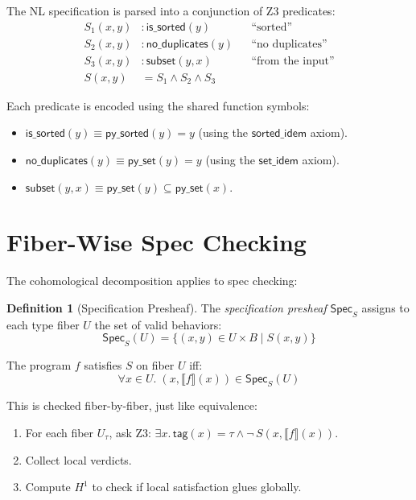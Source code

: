 \documentclass[11pt,a4paper]{report}
\theoremstyle{definition}
\newtheorem{definition}{Definition}[chapter]
\theoremstyle{plain}
\newcommand{\den}[1]{\llbracket #1 \rrbracket}
\newcommand{\Hone}{H^1}
\begin{document}
The NL specification is parsed into a conjunction of Z3 predicates:
\begin{align}
  S_1(x, y) &: \mathsf{is\_sorted}(y)
    && \text{``sorted''} \\
  S_2(x, y) &: \mathsf{no\_duplicates}(y)
    && \text{``no duplicates''} \\
  S_3(x, y) &: \mathsf{subset}(y, x)
    && \text{``from the input''} \\
  S(x, y) &= S_1 \land S_2 \land S_3
\end{align}

Each predicate is encoded using the shared function symbols:
\begin{itemize}
  \item $\mathsf{is\_sorted}(y) \equiv \mathsf{py\_sorted}(y) = y$
    (using the $\mathsf{sorted\_idem}$ axiom).
  \item $\mathsf{no\_duplicates}(y) \equiv \mathsf{py\_set}(y) = y$
    (using the $\mathsf{set\_idem}$ axiom).
  \item $\mathsf{subset}(y, x) \equiv \mathsf{py\_set}(y) \subseteq
    \mathsf{py\_set}(x)$.
\end{itemize}

\section{Fiber-Wise Spec Checking}

The cohomological decomposition applies to spec checking:

\begin{definition}[Specification Presheaf]
The \emph{specification presheaf} $\mathsf{Spec}_S$ assigns to each
type fiber $U$ the set of valid behaviors:
\[
  \mathsf{Spec}_S(U) = \{(x, y) \in U \times B \mid S(x, y)\}
\]
\end{definition}

The program $f$ satisfies $S$ on fiber $U$ iff:
\[
  \forall x \in U.\; (x, \den{f}(x)) \in \mathsf{Spec}_S(U)
\]

This is checked fiber-by-fiber, just like equivalence:
\begin{enumerate}
  \item For each fiber $U_\tau$, ask Z3:
    $\exists x.\, \mathsf{tag}(x) = \tau \land \lnot\,S(x, \den{f}(x))$.
  \item Collect local verdicts.
  \item Compute $\Hone$ to check if local satisfaction glues globally.
\end{enumerate}
\end{document}

